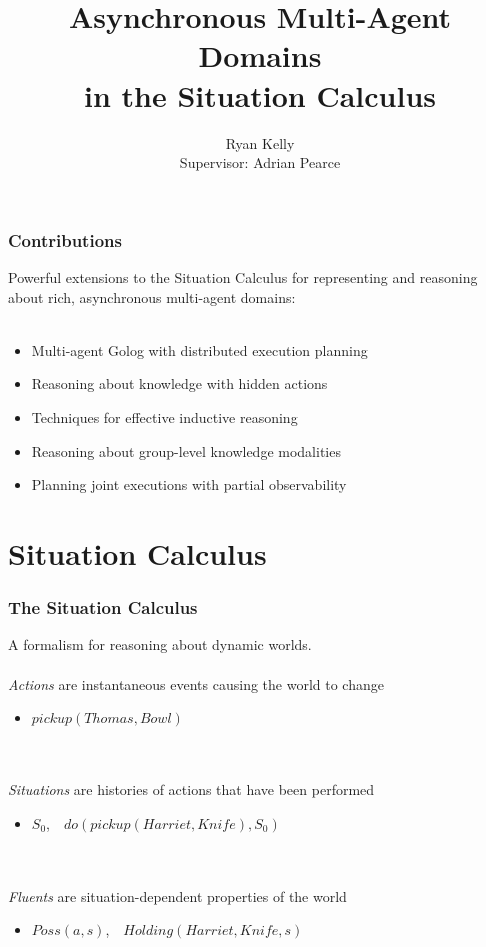 \documentclass{beamer}
\title{Asynchronous Multi-Agent Domains\\ in the Situation Calculus}
\author[Ryan Kelly]{Ryan Kelly\\ Supervisor: Adrian Pearce}
\begin{document}
\begin{frame}
  \titlepage
\end{frame}

\begin{frame}
  \frametitle{Contributions}
  Powerful extensions to the Situation Calculus for representing and reasoning
  about rich, asynchronous multi-agent domains:
  \ \\
  \ \\
  \begin{itemize}
  \item Multi-agent Golog with distributed execution planning
  \item Reasoning about knowledge with hidden actions
  \item Techniques for effective inductive reasoning
  \item Reasoning about group-level knowledge modalities
  \item Planning joint executions with partial observability
  \end{itemize}
\end{frame}

\section{Situation Calculus}

\begin{frame}
\frametitle{The Situation Calculus}
A formalism for reasoning about dynamic worlds.
\ \\
\ \\
\emph{Actions} are instantaneous events causing the world to change
\begin{itemize}
  \item $pickup(Thomas,Bowl)$
\end{itemize}
\ \\
\ \\
\emph{Situations} are histories of actions that have been performed
\begin{itemize}
  \item $S_0$,\ \ $do(pickup(Harriet,Knife),S_0)$
\end{itemize}
\ \\
\ \\
\emph{Fluents} are situation-dependent properties of the world
\begin{itemize}
  \item $Poss(a,s)$,\ \ $Holding(Harriet,Knife,s)$
\end{itemize}
\end{frame}
\end{document}
